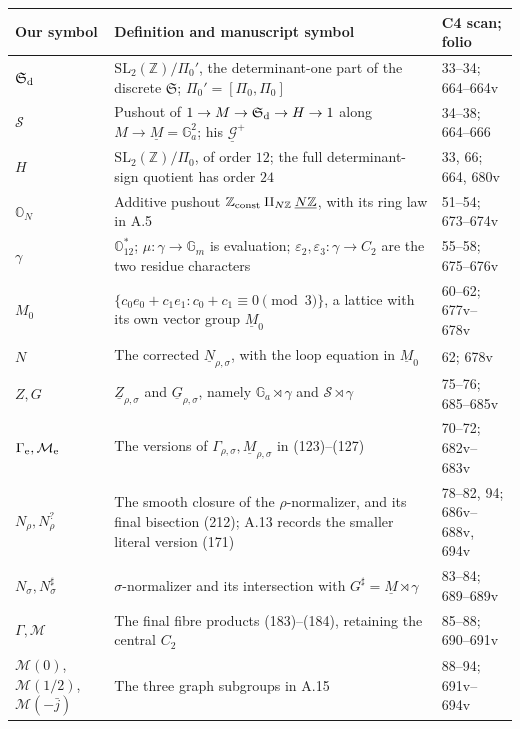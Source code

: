 \begin{longtable}{@{}p{.18\linewidth}p{.56\linewidth}p{.18\linewidth}@{}}
\toprule
Our symbol & Definition and manuscript symbol & C4 scan; folio\\
\midrule\endhead
$\mathfrak S_{\rm d}$ & $\mathrm{SL}_2(\mathbb Z)/\Pi_0'$, the determinant-one part of the discrete $\mathfrak S$; $\Pi_0'=[\Pi_0,\Pi_0]$ & 33--34; 664--664v\\
$\mathcal S$ & Pushout of $1\to M\to\mathfrak S_{\rm d}\to H\to1$ along $M\to\underline M=\mathbb G_a^2$; his $\underline{\mathcal G}^{+}$ & 34--38; 664--666\\
$H$ & $\mathrm{SL}_2(\mathbb Z)/\Pi_0$, of order $12$; the full determinant-sign quotient has order $24$ & 33, 66; 664, 680v\\
$\mathbb O_N$ & Additive pushout $\mathbb Z_{\rm const}\amalg_{N\mathbb Z}\underline{N\mathbb Z}$, with its ring law in A.5 & 51--54; 673--674v\\
$\gamma$ & $\mathbb O_{12}^{*}$; $\mu:\gamma\to\mathbb G_m$ is evaluation; $\varepsilon_2,\varepsilon_3:\gamma\to C_2$ are the two residue characters & 55--58; 675--676v\\
$M_0$ & $\{c_0e_0+c_1e_1:c_0+c_1\equiv0\pmod3\}$, a lattice with its own vector group $\underline M_0$ & 60--62; 677v--678v\\
$N$ & The corrected $\underline N_{\rho,\sigma}$, with the loop equation in $\underline M_0$ & 62; 678v\\
$Z,G$ & $\underline Z_{\rho,\sigma}$ and $\underline G_{\rho,\sigma}$, namely $\mathbb G_a\rtimes\gamma$ and $\mathcal S\rtimes\gamma$ & 75--76; 685--685v\\
$\Gamma_{\rm e},\mathcal M_{\rm e}$ & The versions of $\Gamma_{\rho,\sigma},\underline M_{\rho,\sigma}$ in (123)--(127) & 70--72; 682v--683v\\
$N_\rho,N_\rho^{?}$ & The smooth closure of the $\rho$-normalizer, and its final bisection (212); A.13 records the smaller literal version (171) & 78--82, 94; 686v--688v, 694v\\
$N_\sigma,N_\sigma^\sharp$ & $\sigma$-normalizer and its intersection with $G^\sharp=\underline M\rtimes\gamma$ & 83--84; 689--689v\\
$\Gamma,\mathcal M$ & The final fibre products (183)--(184), retaining the central $C_2$ & 85--88; 690--691v\\
$\mathcal M(0)$,\newline $\mathcal M(1/2)$,\newline $\mathcal M(-\bar j)$ & The three graph subgroups in A.15 & 88--94; 691v--694v\\
\bottomrule
\end{longtable}

